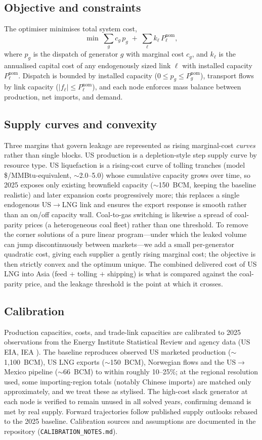 \documentclass[sn-nature]{sn-jnl}
\theoremstyle{thmstyleone}%
\theoremstyle{thmstyletwo}%
\theoremstyle{thmstylethree}%
\begin{document}
\subsection*{Objective and constraints}
The optimiser minimises total system cost,
\begin{equation}
\min \; \sum_{g} c_g\, p_g \;+\; \sum_{\ell} k_\ell\, P_\ell^{\mathrm{nom}},
\end{equation}
where $p_g$ is the dispatch of generator $g$ with marginal cost $c_g$, and
$k_\ell$ is the annualised capital cost of any endogenously sized link
$\ell$ with installed capacity $P_\ell^{\mathrm{nom}}$. Dispatch is bounded
by installed capacity ($0 \le p_g \le P_g^{\mathrm{nom}}$), transport flows
by link capacity ($|f_\ell| \le P_\ell^{\mathrm{nom}}$), and each node
enforces mass balance between production, net imports, and demand.

\subsection*{Supply curves and convexity}
Three margins that govern leakage are represented as rising marginal-cost
\emph{curves} rather than single blocks. US production is a depletion-style
step supply curve by resource type. US liquefaction is a rising-cost curve of
tolling tranches (model \$/MMBtu-equivalent, $\sim$2.0--5.0) whose cumulative
capacity grows over time, so 2025 exposes only existing brownfield capacity
($\sim$150~BCM, keeping the baseline realistic) and later expansion costs
progressively more; this replaces a single endogenous US$\rightarrow$LNG link
and ensures the export response is smooth rather than an on/off capacity wall.
Coal-to-gas switching is likewise a spread of coal-parity prices (a
heterogeneous coal fleet) rather than one threshold. To remove the corner
solutions of a pure linear program---under which the leaked volume can jump
discontinuously between markets---we add a small per-generator quadratic cost,
giving each supplier a gently rising marginal cost; the objective is then
strictly convex and the optimum unique. The combined delivered cost of US LNG
into Asia (feed $+$ tolling $+$ shipping) is what is compared against the
coal-parity price, and the leakage threshold is the point at which it crosses.
\subsection*{Calibration}
Production capacities, costs, and trade-link capacities are calibrated to
2025 observations from the Energy Institute Statistical Review \citep{EI2024}
and agency data (US EIA, IEA \citep{iea_gas2019}). The baseline reproduces observed US marketed production
($\sim$1{,}100~BCM), US LNG exports ($\sim$150~BCM), Norwegian flows and the
US$\rightarrow$Mexico pipeline ($\sim$66~BCM) to within roughly 10--25\%; at
the regional resolution used, some importing-region totals (notably Chinese
imports) are matched only approximately, and we treat these as stylised. The
high-cost slack generator at each node is verified to remain unused in all
solved years, confirming demand is met by real supply. Forward trajectories
follow published supply outlooks rebased to the 2025 baseline. Calibration
sources and assumptions are documented in the repository
(\texttt{CALIBRATION\_NOTES.md}).
\end{document}
